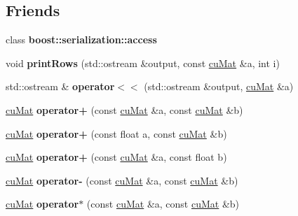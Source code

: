 \subsection*{Friends}
\begin{DoxyCompactItemize}
\item 
\mbox{\label{classcuMat_ac98d07dd8f7b70e16ccb9a01abf56b9c}} 
class {\bfseries boost\+::serialization\+::access}
\item 
\mbox{\label{classcuMat_a137bdd4d1be179ce52c9d2231d1eb2bf}} 
void {\bfseries print\+Rows} (std\+::ostream \&output, const \mbox{\hyperlink{classcuMat}{cu\+Mat}} \&a, int i)
\item 
\mbox{\label{classcuMat_a3fc62e3d7f93325eb6a3ddd04729eeff}} 
std\+::ostream \& {\bfseries operator$<$$<$} (std\+::ostream \&output, \mbox{\hyperlink{classcuMat}{cu\+Mat}} \&a)
\item 
\mbox{\label{classcuMat_a62ab5b9219f978d4cb122f77c258bff5}} 
\mbox{\hyperlink{classcuMat}{cu\+Mat}} {\bfseries operator+} (const \mbox{\hyperlink{classcuMat}{cu\+Mat}} \&a, const \mbox{\hyperlink{classcuMat}{cu\+Mat}} \&b)
\item 
\mbox{\label{classcuMat_a2a9c317b4008986235427a101464d318}} 
\mbox{\hyperlink{classcuMat}{cu\+Mat}} {\bfseries operator+} (const float a, const \mbox{\hyperlink{classcuMat}{cu\+Mat}} \&b)
\item 
\mbox{\label{classcuMat_a1d4b683ad0d961226cc140fc78b7bdb8}} 
\mbox{\hyperlink{classcuMat}{cu\+Mat}} {\bfseries operator+} (const \mbox{\hyperlink{classcuMat}{cu\+Mat}} \&a, const float b)
\item 
\mbox{\label{classcuMat_a521a116b3ec729502947f94ff3821751}} 
\mbox{\hyperlink{classcuMat}{cu\+Mat}} {\bfseries operator-\/} (const \mbox{\hyperlink{classcuMat}{cu\+Mat}} \&a, const \mbox{\hyperlink{classcuMat}{cu\+Mat}} \&b)
\item 
\mbox{\label{classcuMat_a9a1fd27e3fb24a8e181f7e6b3cf365a4}} 
\mbox{\hyperlink{classcuMat}{cu\+Mat}} {\bfseries operator$\ast$} (const \mbox{\hyperlink{classcuMat}{cu\+Mat}} \&a, const \mbox{\hyperlink{classcuMat}{cu\+Mat}} \&b)

\end{DoxyCompactItemize}
